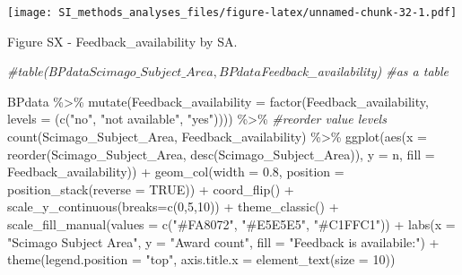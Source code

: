 \documentclass[
]{article}
\newenvironment{Shaded}{\begin{snugshade}}{\end{snugshade}}
\newcommand{\AttributeTok}[1]{\textcolor[rgb]{0.77,0.63,0.00}{#1}}
\newcommand{\CommentTok}[1]{\textcolor[rgb]{0.56,0.35,0.01}{\textit{#1}}}
\newcommand{\ConstantTok}[1]{\textcolor[rgb]{0.00,0.00,0.00}{#1}}
\newcommand{\DecValTok}[1]{\textcolor[rgb]{0.00,0.00,0.81}{#1}}
\newcommand{\FloatTok}[1]{\textcolor[rgb]{0.00,0.00,0.81}{#1}}
\newcommand{\FunctionTok}[1]{\textcolor[rgb]{0.00,0.00,0.00}{#1}}
\newcommand{\NormalTok}[1]{#1}
\newcommand{\SpecialCharTok}[1]{\textcolor[rgb]{0.00,0.00,0.00}{#1}}
\newcommand{\StringTok}[1]{\textcolor[rgb]{0.31,0.60,0.02}{#1}}
\begin{document}
\texttt{[image: SI\_methods\_analyses\_files/figure-latex/unnamed-chunk-32-1.pdf]}

Figure SX - Feedback\_availability by SA.

\begin{Shaded}
\begin{Highlighting}[]
\CommentTok{\#table(BPdata$Scimago\_Subject\_Area, BPdata$Feedback\_availability) \#as a table}

\NormalTok{BPdata }\SpecialCharTok{\%\textgreater{}\%} 
    \FunctionTok{mutate}\NormalTok{(}\AttributeTok{Feedback\_availability =} \FunctionTok{factor}\NormalTok{(Feedback\_availability, }\AttributeTok{levels =}\NormalTok{ (}\FunctionTok{c}\NormalTok{(}\StringTok{"no"}\NormalTok{, }\StringTok{"not available"}\NormalTok{, }\StringTok{"yes"}\NormalTok{)))) }\SpecialCharTok{\%\textgreater{}\%} \CommentTok{\#reorder value levels}
    \FunctionTok{count}\NormalTok{(Scimago\_Subject\_Area, Feedback\_availability) }\SpecialCharTok{\%\textgreater{}\%}
    \FunctionTok{ggplot}\NormalTok{(}\FunctionTok{aes}\NormalTok{(}\AttributeTok{x =} \FunctionTok{reorder}\NormalTok{(Scimago\_Subject\_Area, }\FunctionTok{desc}\NormalTok{(Scimago\_Subject\_Area)), }\AttributeTok{y =}\NormalTok{ n, }\AttributeTok{fill =}\NormalTok{ Feedback\_availability)) }\SpecialCharTok{+} 
    \FunctionTok{geom\_col}\NormalTok{(}\AttributeTok{width =} \FloatTok{0.8}\NormalTok{, }\AttributeTok{position =} \FunctionTok{position\_stack}\NormalTok{(}\AttributeTok{reverse =} \ConstantTok{TRUE}\NormalTok{)) }\SpecialCharTok{+}
    \FunctionTok{coord\_flip}\NormalTok{() }\SpecialCharTok{+}
    \FunctionTok{scale\_y\_continuous}\NormalTok{(}\AttributeTok{breaks=}\FunctionTok{c}\NormalTok{(}\DecValTok{0}\NormalTok{,}\DecValTok{5}\NormalTok{,}\DecValTok{10}\NormalTok{)) }\SpecialCharTok{+}
    \FunctionTok{theme\_classic}\NormalTok{() }\SpecialCharTok{+} 
    \FunctionTok{scale\_fill\_manual}\NormalTok{(}\AttributeTok{values =} \FunctionTok{c}\NormalTok{(}\StringTok{"\#FA8072"}\NormalTok{, }\StringTok{"\#E5E5E5"}\NormalTok{, }\StringTok{"\#C1FFC1"}\NormalTok{)) }\SpecialCharTok{+}
    \FunctionTok{labs}\NormalTok{(}\AttributeTok{x =} \StringTok{"Scimago Subject Area"}\NormalTok{, }\AttributeTok{y =} \StringTok{"Award count"}\NormalTok{, }\AttributeTok{fill =} \StringTok{"Feedback is availabile:"}\NormalTok{) }\SpecialCharTok{+} 
    \FunctionTok{theme}\NormalTok{(}\AttributeTok{legend.position =} \StringTok{"top"}\NormalTok{, }\AttributeTok{axis.title.x =} \FunctionTok{element\_text}\NormalTok{(}\AttributeTok{size =} \DecValTok{10}\NormalTok{))}
\end{Highlighting}
\end{Shaded}
\end{document}
